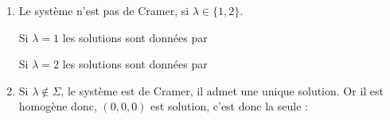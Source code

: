 \begin{correction}
\begin{enumerate}
\item Le système n'est pas de Cramer, si $\lambda\in \{1,2\}$.

Si $\lambda=1$ les solutions sont données par 

Si $\lambda=2$ les solutions sont données par 

\item Si $\lambda\notin \Sigma$, le système est de Cramer, il admet une unique solution. Or il est homogène donc, $(0,0,0)$ est solution, c'est donc la seule :
\end{enumerate}
\end{correction}